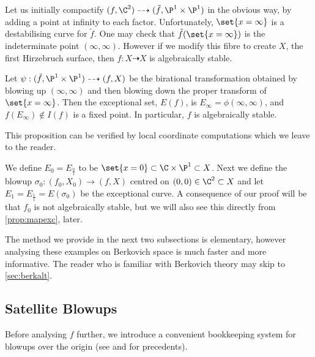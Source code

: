 \documentclass[11pt, final]{amsart}
\newcommand{\dashto}{\dashrightarrow}
\newcommand{\nin}{\notin}
\begin{document}
Let us initially compactify $(f, \C^2) \dashto (\tilde f, \P^1 \times \P^1)$ in the obvious way, by adding a point at infinity to each factor. Unfortunately, $\set{x=\infty}$ is a destabilising curve for $\tilde f$. %
One may check that $\tilde f(\set{x=\infty})$ is the indeterminate point $(\infty, \infty)$. However if we modify this fibre to create $X$, the first Hirzebruch surface, then $f : X \dashto X$ is algebraically stable.

\begin{prop}\label{prop:initialstability}
 Let $\psi : (\tilde f, \P^1 \times \P^1) \dashto (f, X)$ be the birational transformation obtained by blowing up $(\infty, \infty)$ and then blowing down the proper transform of $\set{x = \infty}$. Then the exceptional set, $E(f)$, is $E_\infty = \phi(\infty, \infty)$, and $f(E_\infty) \nin I(f)$ is a fixed point. In particular, $f$ is algebraically stable.
\end{prop}

This proposition can be verified by local coordinate computations which we leave to the reader. %

We define $E_0 = E_{\frac 01}$ to be $\set{x=0} \subset \C \times \P^1 \subset X$. Next we define the blowup $\sigma_0 : (f_0, X_0) \to (f, X)$ centred on $(0, 0) \in \C^2 \subset X$ and let $E_1 = E_{\frac 11} = E(\sigma_0)$ be the exceptional curve. A consequence of our proof will be that $f_0$ is not algebraically stable, but we will also see this directly from \autoref{prop:mapexc}, later.

The method we provide in the next two subsections is elementary, however analysing these examples on Berkovich space is much faster and more informative. The reader who is familiar with Berkovich theory may skip to \autoref{sec:berkalt}.

\subsection{Satellite Blowups}

Before analysing $f$ further, we introduce a convenient bookkeeping system for blowups over the origin (see \cite[\S 15.1]{Jon} and \cite[appx]{DL} for precedents).
\end{document}
